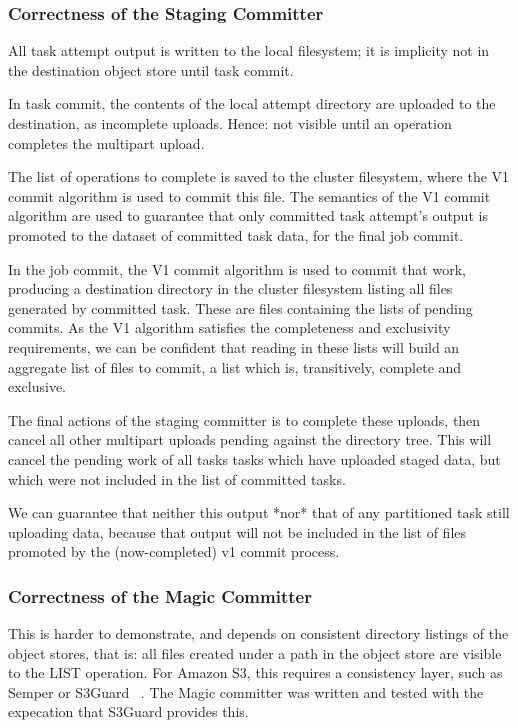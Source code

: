 \documentclass[conference]{IEEEtran}
\begin{document}
\subsubsection{Correctness of the Staging Committer}

All task attempt output is written to the local filesystem;
it is implicity not in the destination object store until task commit.

In task commit, the contents of the local attempt directory are uploaded to the
destination, as incomplete uploads.
Hence: not visible until an operation completes the multipart upload.

The list of operations to complete is saved to the cluster filesystem, where
the V1 commit algorithm is used to commit this file.
The semantics of the V1 commit algorithm are used to guarantee that only
committed task attempt's output is promoted to the dataset of committed task
data, for the final job commit.

In the job commit, the V1 commit algorithm is used to commit that work, producing
a destination directory in the cluster filesystem listing all files generated
by committed task.
These are files containing the lists of pending commits.
As the V1 algorithm satisfies the completeness and exclusivity requirements,
we can be confident that reading in these lists will build an aggregate list
of files to commit, a list which is, transitively, complete and exclusive.

The final actions of the staging committer is to complete these uploads,
then cancel all other multipart uploads pending against the directory tree.
This will cancel the pending work of all tasks tasks which have uploaded staged
data, but which were not included in the list of committed tasks.

We can guarantee that neither this output *nor* that of any partitioned
task still uploading data, because that output will not be included in the
list of files promoted by the (now-completed) v1 commit process.

\subsubsection{Correctness of the Magic Committer}

This is harder to demonstrate, and depends on consistent directory
listings of the object stores, that is: all files created under a path
in the object store are visible to the LIST operation.
For Amazon S3, this requires a consistency layer, such as Semper or S3Guard
\ \cite{semper, S3Guard}.
The Magic committer was written and tested with the expecation that S3Guard
provides this.
\end{document}
